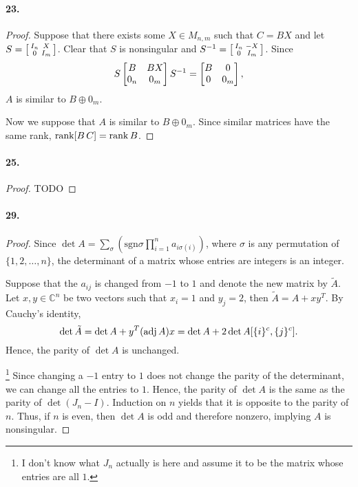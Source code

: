   \paragraph{23.}
  \begin{proof}
    Suppose that there exists some $X\in M_{n,m}$ such that $C=BX$ and let 
    $S=\begin{bsmallmatrix} I_n & X \\ 0 & I_m \end{bsmallmatrix}$. Clear that
    $S$ is nonsingular and $S^{-1}=\begin{bsmallmatrix} I_n & -X \\ 0 & I_m 
    \end{bsmallmatrix}$. Since
    \[
      S\begin{bmatrix}B & BX \\ 0_n & 0_m\end{bmatrix}S^{-1} = 
      \begin{bmatrix} B & 0 \\ 0 & 0_m\end{bmatrix},
    \]
    $A$ is similar to $B\oplus 0_m$.\par
    Now we suppose that $A$ is similar to $B\oplus 0_m$. Since similar matrices
    have the same rank, $\operatorname{rank}[B\,C] = \operatorname{rank} B$.    
  \end{proof}

  \paragraph{25.}
  \begin{proof}
    TODO
  \end{proof}

  \paragraph{29.}
  \begin{proof}
    Since $\det A=\sum_\sigma(\text{sgn}\sigma \prod_{i=1}^n a_{i\sigma(i)})$, 
    where $\sigma$ is any permutation of $\{1,2,\dots, n\}$, the determinant of 
    a matrix whose entries are integers is an integer.\par
    Suppose that the $a_{ij}$ is changed from $-1$ to $1$ and denote the new 
    matrix by $\tilde{A}$. Let $x,y\in\mathbb{C}^n$ be two vectors such that 
    $x_i=1$ and $y_j=2$, then $\tilde{A} = A + xy^T$. By Cauchy's identity,
    \[
      \det\tilde{A} = \det A + y^T(\operatorname{adj} A)x = \det A + 2\det A[\{i\}^c,\{j\}^c].
    \]
    Hence, the parity of $\det A$ is unchanged.\par
    \footnote{I don't know what $J_n$ actually is here and assume it to be the 
    matrix whose entries are all $1$.} Since changing a $-1$ entry to $1$ does 
    not change the parity of the determinant, we can change all the entries to 
    $1$. Hence, the parity of $\det A$ is the same as the parity of $\det(J_n-
    I)$. Induction on $n$ yields that it is opposite to the parity of $n$. Thus,
    if $n$ is even, then $\det A$ is odd and therefore nonzero, implying $A$ is 
    nonsingular.
  \end{proof}


